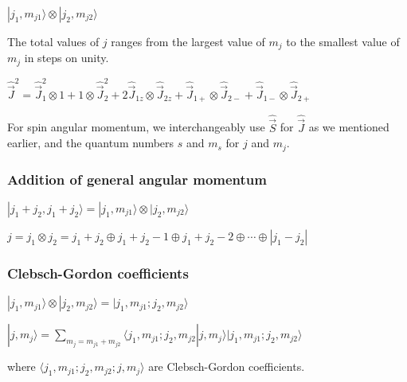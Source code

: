 $| j_1, m_{j1} \rangle \otimes | j_2, m_{j2} \rangle$


The total values of $j$ ranges from the largest value of $m_j$ to the smallest value of $m_j$ in steps on unity. 


$\widehat{\vec{J}}^2 = \widehat{\vec{J}}^2_1 \otimes 1 + 1 \otimes \widehat{\vec{J}}_2^2 + 2 \widehat{\vec{J}}_{1z} \otimes \widehat{\vec{J}}_{2z} + \widehat{\vec{J}}_{1+} \otimes \widehat{\vec{J}}_{2-} + \widehat{\vec{J}}_{1-} \otimes \widehat{\vec{J}}_{2+}$

For spin angular momentum, we interchangeably use $\widehat{\vec{S}}$ for $\widehat{\vec{J}}$ as we mentioned earlier, and the quantum numbers $s$ and $m_s$ for $j$ and $m_j$.

\subsubsection{Addition of general angular momentum}

$|j_1 + j_2, j_1 + j_2 \rangle = | j_1, m_{j1} \rangle \otimes |j_2, m_{j2} \rangle$

$j = j_1 \otimes j_2 = j_1 + j_2 \oplus j_1 + j_2 - 1 \oplus j_1 + j_2 - 2 \oplus \cdots \oplus |j_1 - j_2|$

\subsubsection{Clebsch-Gordon coefficients}
$|j_1, m_{j1} \rangle \otimes | j_2, m_{j2} \rangle = |j_1, m_{j1}; j_2, m_{j2} \rangle$

$|j, m_j \rangle = \sum_{m_j = m_{j1} + m_{j2}} \langle j_1, m_{j1}; j_2, m_{j2} | j, m_j \rangle | j_1, m_{j1}; j_2, m_{j2} \rangle$

where $\langle j_1, m_{j1}; j_2, m_{j2}; j, m_j \rangle$ are Clebsch-Gordon coefficients.

